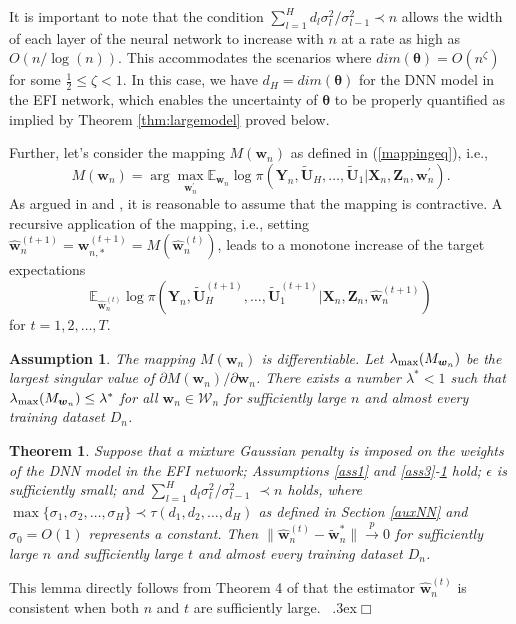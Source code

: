 \documentclass[11pt]{article}
\newcommand{\bX}{{\boldsymbol X}}
\newcommand{\bY}{{\boldsymbol Y}}
\newcommand{\bZ}{{\boldsymbol Z}}
\newcommand{\bw}{{\boldsymbol w}}
\newcommand{\bU}{{\boldsymbol U}}
\newcommand{\btheta}{{\boldsymbol \theta}}
\newtheorem{theorem}{Theorem}[section]
\newtheorem{assumption}{Assumption}
\newenvironment{proof}{\trivlist\item[\hskip \labelsep{\sc Proof:}]}
 {\unskip\nobreak\ \lower.3ex\hbox{$\Box$}\endtrivlist}
\begin{document}
 It is important to note that the condition $\sum_{l=1}^H d_l \sigma_l^2/\sigma_{l-1}^2 \prec n$ allows the width of each layer of the neural network 
 to increase with $n$ at a rate  as high as $O(n/\log(n))$. 
 This accommodates the scenarios where  
  $dim(\btheta)=O(n^{\zeta})$ for some $\frac{1}{2} \leq  \zeta <1$. 
 In this case, we have $d_H=dim(\btheta)$ for the DNN model in the EFI network, which enables the uncertainty of $\btheta$ to be properly quantified as implied by Theorem \ref{thm:largemodel} proved below.



 

 
Further, let's consider the mapping $M(\bw_n)$ as defined in (\ref{mappingeq}), i.e., 
\[
M(\bw_n)=\arg\max_{\bw_n^{\prime}}  \mathbb{E}_{\bw_n} \log\pi(\bY_n,\tilde{\bU}_H,\ldots,\tilde{\bU}_1 |\bX_n, \bZ_n,\bw_n^{\prime}).
\]
As argued in \cite{liang2018imputation} and \cite{Nielsen2000}, 
it is reasonable to assume that 
the mapping is contractive. A recursive application of the mapping, i.e., setting
$\hat{\bw}_n^{(t+1)}=\bw_{n,*}^{(t+1)}=M(\hat{\bw}_n^{(t)})$, leads to a monotone increase of the target expectations 
\[
\mathbb{E}_{\hat{\bw}_n^{(t)}} \log \pi(\bY_n, \tilde{\bU}_H^{(t+1)},\ldots,\tilde{\bU}_1^{(t+1)}|\bX_n,\bZ_n,\hat{\bw}_n^{(t+1)})
\]
for $t=1,2,\ldots,T$. 

\begin{assumption} \label{ass6}  The mapping $M(\bw_n)$ is differentiable. Let $\lambda_{\rm \max}(M_{\bw_n})$ be the largest singular value of $\partial M(\bw_n)/\partial \bw_n$. There
exists a number $\lambda^* <1$ such that  $\lambda_{\rm \max} (M_{\bw_n})\leq \lambda^*$ for all 
$\bw_n \in \mathcal{W}_n$ for sufficiently large $n$ and almost every training dataset $D_n$.
\end{assumption}

 \begin{theorem} \label{lemma:partII} Suppose that a mixture Gaussian penalty is imposed on the weights of the DNN model in the EFI network; Assumptions 
\ref{ass1} and \ref{ass3}-\ref{ass6} hold; $\epsilon$ is sufficiently small; and 
$\sum_{l=1}^H d_l \sigma_l^2/\sigma_{l-1}^2$ $\prec n$ holds, 
where $\max\{\sigma_1, \sigma_2, \ldots, \sigma_H\} \prec \tau(d_1,d_2,\ldots,d_H)$ as defined in Section \ref{auxNN} and $\sigma_0=O(1)$ represents a constant.  
Then $\|\hat{\bw}_n^{(t)} -\tilde{\bw}_n^*\| \stackrel{p}{\to} 0$ for sufficiently large $n$ and sufficiently large $t$ and almost every training dataset $D_n$. 
\end{theorem}
\begin{proof}
This lemma directly follows from Theorem 4 of \cite{liang2018imputation} that the estimator $\hat{\bw}_n^{(t)}$ is consistent when both $n$ and $t$ are sufficiently large.
\end{proof}
\end{document}
